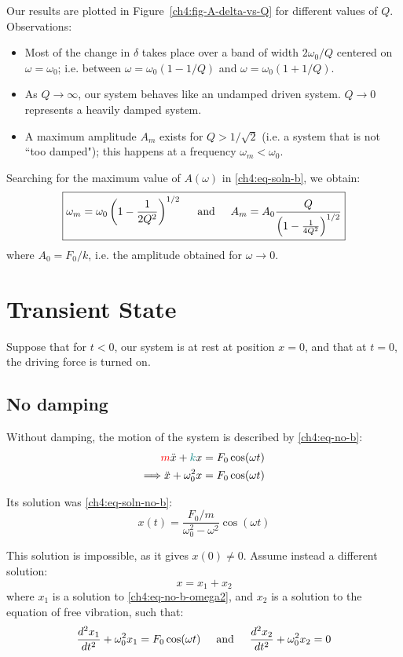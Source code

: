 Our results %
are plotted in Figure~\ref{ch4:fig-A-delta-vs-Q} for different values of $Q$. Observations:
\begin{itemize}
	\item Most of the change in $\delta$ takes place over a band of width $2\omega_0/Q$ centered on $\omega=\omega_0$; i.e. between $\omega=\omega_0(1-1/Q)$ and $\omega=\omega_0(1+1/Q)$.
	\item As $Q\to\infty$, our system behaves like an undamped driven system. $Q\to 0$ represents a heavily damped system.
	\item A maximum amplitude $A_m$ exists for $Q>1/\sqrt{2}$ (i.e. a system that is not ``too damped"); this happens at a frequency $\omega_m < \omega_0$.
\end{itemize}

Searching for the maximum value of $A(\omega)$ in \eqref{ch4:eq-soln-b}, we obtain:
\begin{equation}
\boxed{
	\omega_m = \omega_0 \left( 1-\frac{1}{2Q^2} \right)^{1/2} \hspace{0.5cm}\text{and}\hspace{0.5cm}
	A_m = A_0 \frac{Q}{\left( 1-\frac{1}{4Q^2} \right)^{1/2}} 
}	\label{ch4:eq-damping-Am}
\end{equation}
where $A_0=F_0/k$, i.e. the amplitude obtained for $\omega\to 0$.

\section{Transient State}
Suppose that for $t<0$, our system is at rest at position $x=0$, and that at $t=0$, the driving force is turned on.

\subsection{No damping}
Without damping, the motion of the system is described by \eqref{ch4:eq-no-b}:
\begin{align}
	\textcolor{red}{m}\ddot{x} + \textcolor{teal}{k}x &= F_0 \cos(\omega t) \notag \\
	\Longrightarrow \ddot{x} + \omega_0^2 x &= F_0 \cos(\omega t) 	\label{ch4:eq-no-b-omega2}
\end{align}

Its solution was \eqref{ch4:eq-soln-no-b}:
\[ x(t) = \frac{F_0/m} {\omega_0^2 - \omega^2} \cos(\omega t) \]

This solution is impossible, as it gives $x(0) \neq 0$. 
Assume instead a different solution: 
$$x = x_1 + x_2$$
where $x_1$ is a solution to \eqref{ch4:eq-no-b-omega2}, and $x_2$ is a solution to the equation of free vibration, such that:
\begin{equation*}
	\frac{d^2x_1}{dt^2} + \omega_0^2 x_1 = F_0 \cos(\omega t)  \hspace{0.5cm}\text{and}\hspace{0.5cm}
	\frac{d^2x_2}{dt^2} + \omega_0^2 x_2 = 0
\end{equation*}


